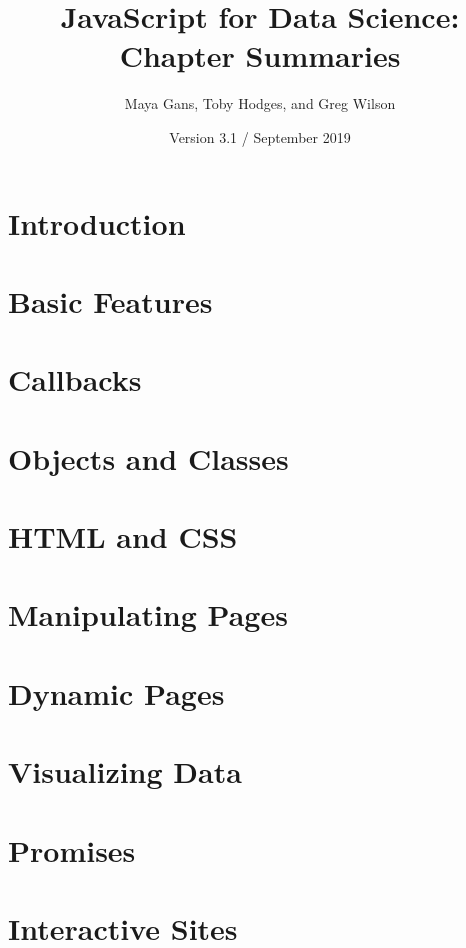 \documentclass{article}
\begin{document}
\title{JavaScript for Data Science: Chapter Summaries}
\author{Maya Gans, Toby Hodges, and Greg Wilson}
\date{Version 3.1 / September 2019}
\maketitle

\section{Introduction}

\section{Basic Features}

\section{Callbacks}

\section{Objects and Classes}

\section{HTML and CSS}

\section{Manipulating Pages}

\section{Dynamic Pages}

\section{Visualizing Data}

\section{Promises}

\section{Interactive Sites}
\end{document}
